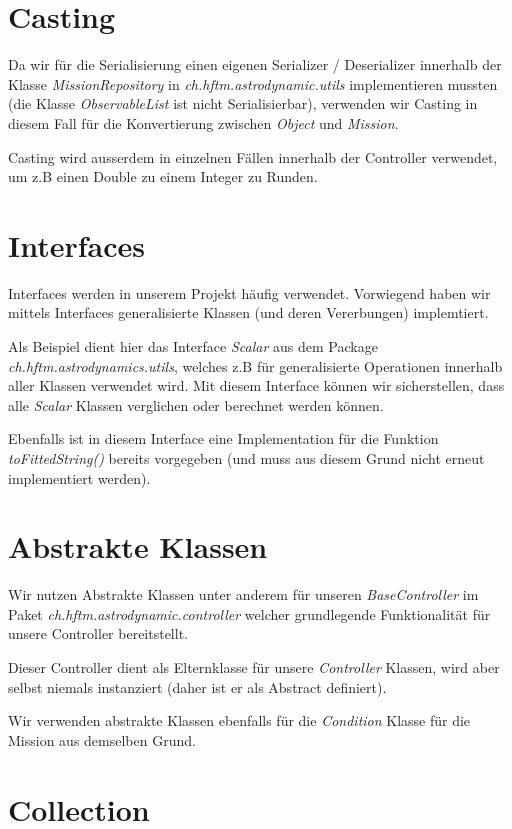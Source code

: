 \section{Casting}

Da wir für die Serialisierung einen eigenen Serializer / Deserializer innerhalb der Klasse \textit{MissionRepository} in \textit{ch.hftm.astrodynamic.utils} implementieren mussten (die Klasse \textit{ObservableList} ist nicht Serialisierbar), verwenden wir Casting in diesem Fall für die Konvertierung zwischen \textit{Object} und \textit{Mission}.

Casting wird ausserdem in einzelnen Fällen innerhalb der Controller verwendet, um z.B einen Double zu einem Integer zu Runden.

\section{Interfaces}

Interfaces werden in unserem Projekt häufig verwendet. Vorwiegend haben wir mittels Interfaces generalisierte Klassen (und deren Vererbungen) implemtiert.

Als Beispiel dient hier das Interface \textit{Scalar} aus dem Package \textit{ch.hftm.astrodynamics.utils}, welches z.B für generalisierte Operationen innerhalb aller Klassen verwendet wird. Mit diesem Interface können wir sicherstellen, dass alle \textit{Scalar} Klassen verglichen oder berechnet werden können.

Ebenfalls ist in diesem Interface eine Implementation für die Funktion \textit{toFittedString()} bereits vorgegeben (und muss aus diesem Grund nicht erneut implementiert werden).

\section{Abstrakte Klassen}

Wir nutzen Abstrakte Klassen unter anderem für unseren \textit{BaseController} im Paket \textit{ch.hftm.astrodynamic.controller} welcher grundlegende Funktionalität für unsere Controller bereitstellt.

Dieser Controller dient als Elternklasse für unsere \textit{Controller} Klassen, wird aber selbst niemals instanziert (daher ist er als Abstract definiert).

Wir verwenden abstrakte Klassen ebenfalls für die \textit{Condition} Klasse für die Mission aus demselben Grund.

\section{Collection}


